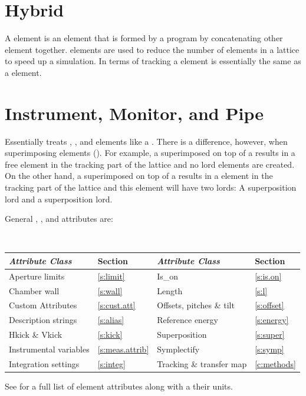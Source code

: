 \section{Hybrid}
\label{s:hybrid}

A  element is an element that is formed by a program by concatenating other element
together.  elements are used to reduce the number of elements in a lattice to speed up a
simulation. In terms of tracking a  element is essentially the same as a 
element.

\section{Instrument, Monitor, and Pipe}
\label{s:monitor}

Essentially \bmad treats , , and 
elements like a . There is a difference, however, when
superimposing elements (). For example, a
 superimposed on top of a  results in a free
 element in the tracking part of the lattice and no
lord elements are created. On the other hand, a 
superimposed on top of a  results in a 
element in the tracking part of the lattice and this 
element will have two lords: A  superposition lord and
a  superposition lord.

General , , and  attributes are:
\begin{center}
\tt
\begin{tabular}{llll} \toprule
  {\sl Attribute Class}      & Section             & {\sl Attribute Class}      & Section         \\ \midrule
  Aperture limits            & \ref{s:limit}       & Is_on                      & \ref{s:is.on}   \\
  Chamber wall               & \ref{s:wall}        & Length                     & \ref{s:l}       \\
  Custom Attributes          & \ref{s:cust.att}    & Offsets, pitches \& tilt   & \ref{s:offset}  \\ 
  Description strings        & \ref{s:alias}       & Reference energy           & \ref{s:energy}  \\
  Hkick \& Vkick             & \ref{s:kick}        & Superposition              & \ref{s:super}   \\
  Instrumental variables     & \ref{s:meas.attrib} & Symplectify                & \ref{s:symp}    \\
  Integration settings       & \ref{s:integ}       & Tracking \& transfer map   & \ref{c:methods} \\
  \bottomrule
\end{tabular}
\end{center}
\toffset
See  for a full list of element attributes along with a their units.

